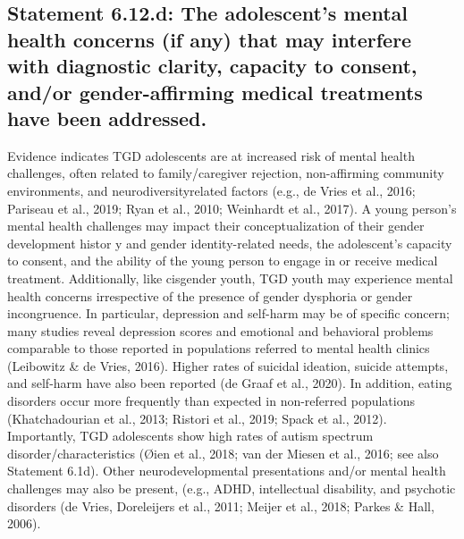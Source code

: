 \documentclass[
]{book}
\begin{document}
\hypertarget{statement-6.12.d-the-adolescents-mental-health-concerns-if-any-that-may-interfere-with-diagnostic-clarity-capacity-to-consent-andor-gender-affirming-medical-treatments-have-been-addressed.}{%
\subsection*{Statement 6.12.d: The adolescent's mental health concerns (if any) that may interfere with diagnostic clarity, capacity to consent, and/or gender-affirming medical treatments have been addressed.}\label{statement-6.12.d-the-adolescents-mental-health-concerns-if-any-that-may-interfere-with-diagnostic-clarity-capacity-to-consent-andor-gender-affirming-medical-treatments-have-been-addressed.}}

Evidence indicates TGD adolescents are at
increased risk of mental health challenges, often
related to family/caregiver rejection, non-affirming
community environments, and neurodiversityrelated factors (e.g., de Vries et al., 2016; Pariseau
et al., 2019; Ryan et al., 2010; Weinhardt et al.,
2017). A young person's mental health challenges
may impact their conceptualization of their gender development histor y and gender
identity-related needs, the adolescent's capacity
to consent, and the ability of the young person
to engage in or receive medical treatment.
Additionally, like cisgender youth, TGD youth
may experience mental health concerns irrespective of the presence of gender dysphoria or gender incongruence. In particular, depression and
self-harm may be of specific concern; many studies reveal depression scores and emotional and
behavioral problems comparable to those reported
in populations referred to mental health clinics
(Leibowitz \& de Vries, 2016). Higher rates of
suicidal ideation, suicide attempts, and self-harm
have also been reported (de Graaf et al., 2020).
In addition, eating disorders occur more frequently than expected in non-referred populations (Khatchadourian et al., 2013; Ristori et al.,
2019; Spack et al., 2012). Importantly, TGD adolescents show high rates of autism spectrum disorder/characteristics (Øien et al., 2018; van der
Miesen et al., 2016; see also Statement 6.1d).
Other neurodevelopmental presentations and/or
mental health challenges may also be present,
(e.g., ADHD, intellectual disability, and psychotic
disorders (de Vries, Doreleijers et al., 2011; Meijer
et al., 2018; Parkes \& Hall, 2006).
\end{document}
